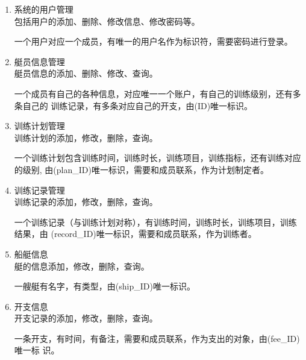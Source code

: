 \begin{enumerate}
\item
  {系统的用户管理\\
    包括用户的添加、删除、修改信息、修改密码等。

    一个用户对应一个成员，有唯一的用户名作为标识符，需要密码进行登录。
  }

\item{艇员信息管理\\
    艇员信息的添加、删除、修改、查询。

    一个成员有自己的各种信息，对应唯一一个账户，有自己的训练级别，还有多条自己的
    训练记录，有多条对应自己的开支，由(ID)唯一标识。
    
  }

\item{训练计划管理\\
    训练计划的添加，修改，删除，查询。

    一个训练计划包含训练时间，训练时长，训练项目，训练指标，还有训练对应的级别,
    由(plan\_ID)唯一标识，需要和成员联系，作为计划制定者。
  }

\item {训练记录管理\\
    训练记录的添加，修改，删除，查询。

    一个训练记录（与训练计划对称），有训练时间，训练时长，训练项目，训练结果，由
    (record\_ID)唯一标识，需要和成员联系，作为训练者。
    
  }

\item {船艇信息\\
    艇的信息添加，修改，删除，查询。

    一艘艇有名字，有类型，由(ship\_ID)唯一标识。
  }

\item {开支信息\\
    开支记录的添加，修改，删除，查询。

    一条开支，有时间，有备注，需要和成员联系，作为支出的对象，由(fee\_ID)唯一标
    识。
  }

\end{enumerate}






